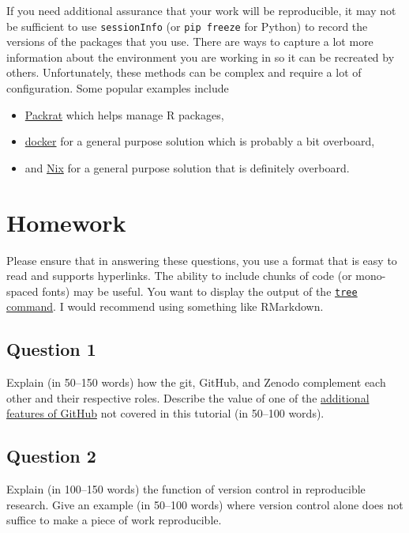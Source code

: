 \documentclass[11pt,onecolumn]{scrartcl}
\begin{document}
If you need additional assurance that your work will be reproducible, it may not
be sufficient to use \texttt{sessionInfo} (or \texttt{pip freeze} for Python) to record the
versions of the packages that you use. There are ways to capture a lot more
information about the environment you are working in so it can be recreated by
others. Unfortunately, these methods can be complex and require a lot of
configuration. Some popular examples include

\begin{itemize}
\item \href{http://rstudio.github.io/packrat/}{Packrat} which helps manage R packages,
\item \href{https://www.docker.com/}{docker} for a general purpose solution which is probably a bit overboard,
\item and \href{https://nixos.org/}{Nix} for a general purpose solution that is definitely overboard.
\end{itemize}

\section{Homework}
\label{sec:org0fd2d36}

Please ensure that in answering these questions, you use a format that is easy
to read and supports hyperlinks. The ability to include chunks of code (or
mono-spaced fonts) may be useful. You want to display the output of the \href{https://en.wikipedia.org/wiki/Tree\_(command)}{\texttt{tree}
command}. I would recommend using something like RMarkdown.

\subsection{Question 1}
\label{sec:orgc4b2d88}

Explain (in 50--150 words) how the git, GitHub, and Zenodo complement each other
and their respective roles. Describe the value of one of the \hyperref[sec:orgc5455d7]{additional features
of GitHub} not covered in this tutorial (in 50--100 words).

\subsection{Question 2}
\label{sec:org772aa68}

Explain (in 100--150 words) the function of version control in reproducible
research. Give an example (in 50--100 words) where version control alone does
not suffice to make a piece of work reproducible.
\end{document}
